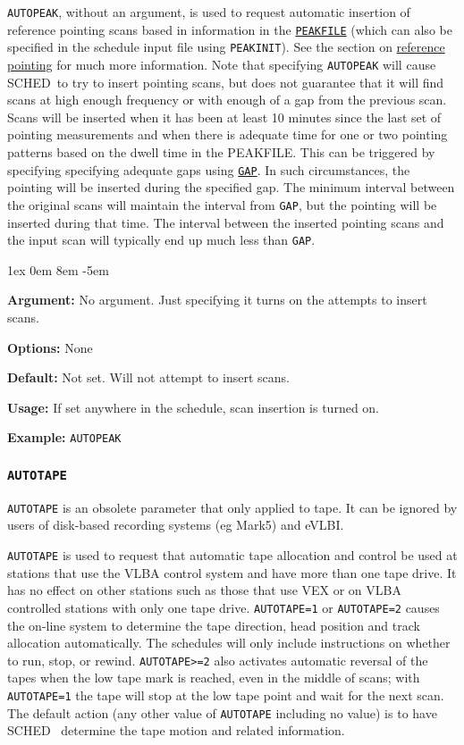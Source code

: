 \documentclass{report}
\newcommand{\schedb}{{\sc SCHED~}}
\newcommand{\rcwbox}[5]{
  \begin{list}{}{\parsep 1ex  \itemsep 0em
                 \leftmargin 8em  \itemindent -5em }
    \item {\bf Argument:} #1
    \item {\bf Options:}  #2
    \item {\bf Default:}  #3
    \item {\bf Usage:}    #4
    \item {\bf Example:}  #5
  \end{list}
}
\begin{document}
{\tt AUTOPEAK}, without an argument, is used to request automatic
insertion of reference pointing scans based in information in
the 
{\hyperref[MP:PEAKFILE]{{\tt PEAKFILE}}} (which can also be specified
in the schedule input file using {\tt PEAKINIT}).  See the
section on 
{\hyperref[SEC:REFPOINT]{reference pointing}} for much
more information.  Note that specifying {\tt AUTOPEAK} will cause
\schedb to try to insert pointing scans, but does not guarantee
that it will find scans at high enough frequency or with enough
of a gap from the previous scan.  Scans will be inserted when it has
been at least 10 minutes since the last set of pointing measurements
and when there is adequate time for one or two pointing patterns
based on the dwell time in the PEAKFILE.  This can be triggered by
specifying specifying adequate gaps using 
{\hyperref[MP:GAP]{{\tt GAP}}}.  In such
circumstances, the pointing will be inserted during the specified 
gap.  The minimum interval between the original scans will maintain the 
interval from {\tt GAP}, but the pointing will be inserted during that
time.  The interval between the inserted pointing scans and the input
scan will typically end up much less than {\tt GAP}.


\rcwbox
{No argument.  Just specifying it turns on the attempts to insert
scans.}
{None}
{Not set.  Will not attempt to insert scans.}
{If set anywhere in the schedule, scan insertion is turned on.}
{\tt AUTOPEAK}


\subsubsection{\label{MP:AUTOTAPE}{\tt AUTOTAPE}}

{\tt AUTOTAPE} is an obsolete parameter that only applied to tape.
It can be ignored by users of disk-based recording systems (eg Mark5)
and eVLBI.

{\tt AUTOTAPE} is used to request that automatic tape allocation and
control be used at stations that use the VLBA control system and have
more than one tape drive.  It has no effect on other stations such as
those that use VEX or on VLBA controlled stations with only one tape
drive.  {\tt AUTOTAPE=1} or {\tt AUTOTAPE=2} causes the on-line system
to determine the tape direction, head position and track allocation
automatically. The schedules will only include instructions on whether
to run, stop, or rewind. {\tt AUTOTAPE>=2} also activates automatic
reversal of the tapes when the low tape mark is reached, even in the
middle of scans; with {\tt AUTOTAPE=1} the tape will stop at the low
tape point and wait for the next scan. The default action (any other
value of {\tt AUTOTAPE} including no value) is to have \schedb
determine the tape motion and related information.
\end{document}
